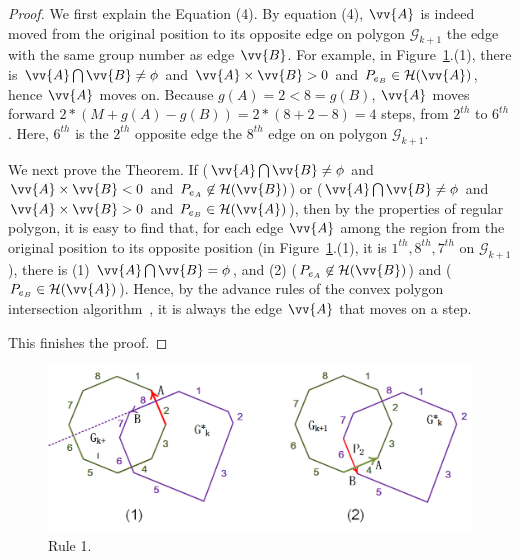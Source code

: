 \begin{proof}
We first explain the Equation (4). 
By equation (4), $\vv{A}$ is indeed moved from the original position to its opposite edge on polygon $\mathcal{G}_{k+1}$ \wrt the edge with the same group number as edge $\vv{B}$.
For example, in Figure~\ref{fig:r-poly-rule1}.(1), there is $\vv{A} \bigcap \vv{B} \ne \phi$ and $\vv{A} \times \vv{B} > 0$ and $P_{e_B} \in \mathcal{H}(\vv{A})$, hence $\vv{A}$ moves on. Because $g(A)=2 < 8=g(B)$, $\vv{A}$ moves forward $2*(M+g(A) - g(B)) = 2*(8+2-8)= 4$ steps, \ie from $2^{th}$ to $6^{th}$. Here, $6^{th}$ is the $2^{th}$ opposite edge \wrt the $8^{th}$ edge on on polygon $\mathcal{G}_{k+1}$.

We next prove the Theorem.
If ($\vv{A} \bigcap \vv{B} \ne \phi$ and $\vv{A} \times \vv{B} < 0$ and $P_{e_A} \not \in \mathcal{H}(\vv{B})$) or ($\vv{A} \bigcap \vv{B} \ne \phi$ and $\vv{A} \times \vv{B} > 0$ and $P_{e_B} \in \mathcal{H}(\vv{A})$), then by the properties of regular polygon, it is easy to find that, for each edge $\vv{A}$ among the region from the original position to its opposite position (\eg in Figure~\ref{fig:r-poly-rule1}.(1), it is $1^{th}, 8^{th}, 7^{th}$ on $\mathcal{G}_{k+1}$), there is (1) $\vv{A} \bigcap \vv{B} = \phi$, and (2) ($P_{e_A} \not \in \mathcal{H}(\vv{B})$) and ($P_{e_B} \in \mathcal{H}(\vv{A})$). Hence, by the advance rules of the convex polygon intersection algorithm~\cite{ORourke:Intersection}, it is always the edge $\vv{A}$ that moves on a step.

This finishes the proof.
\end{proof}

\begin{figure}[tb!]
\centering
\includegraphics[scale=0.88]{figures/Fig-r-poly-rule1.png}
\vspace{-1ex}
\caption{\small Rule 1.}
\vspace{-2ex}
\label{fig:r-poly-rule1}
\end{figure}




